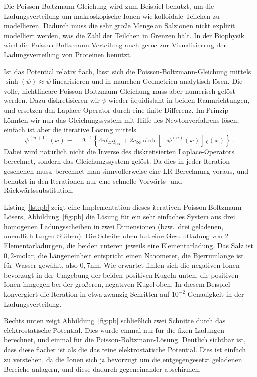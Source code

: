Die Poisson-Boltzmann-Gleichung wird zum Beispiel benutzt, um die
Ladungsverteilung um makroskopische Ionen wie kolloidale Teilchen zu
modellieren. Dadurch muss die sehr große Menge an Salzionen nicht
explizit modelliert werden, was die Zahl der Teilchen in Grenzen
hält. In der Biophysik wird die Poisson-Boltzmann-Verteilung auch
gerne zur Visualisierung der Ladungsverteilung von Proteinen benutzt.

Ist das Potential relativ flach, lässt sich die
Poisson-Boltzmann-Gleichung mittels $\sinh(\psi)\approx \psi$
linearisieren und in manchen Geometrien analytisch lösen. Die volle,
nichtlineare Poisson-Boltzmann-Gleichung muss aber numerisch
gelöst werden. Dazu diskretisieren wir $\psi$ wieder äquidistant in
beiden Raumrichtungen, und ersetzen den Laplace-Operator durch eine
finite Differenz. Im Prinzip könnten wir nun das Gleichungssystem mit
Hilfe des Newtonverfahrens lösen, einfach ist aber die iterative
Lösung mittels
\begin{equation}
  \psi^{(n+1)}(x)  = -\Delta^{-1}\left\{
    4\pi l_Bq_\text{fix} + 2c_\infty\sinh[-\psi^{(n)}(x)]\chi(x)\right\}.
\end{equation}
Dabei wird natürlich nicht die Inverse des diskretisierten
Laplace-Operators berechnet, sondern das Gleichungssystem gelöst. Da
dies in jeder Iteration geschehen muss, berechnet man sinnvollerweise
eine LR-Berechnung voraus, und benutzt in den Iterationen nur eine
schnelle Vorwärts- und Rückwärtssubstitution.

Listing~\ref{lst:pb} zeigt eine Implementation dieses iterativen
Poisson-Boltzmann-Lösers, Abbildung~\ref{fig:pb} die Lösung für ein
sehr einfaches System aus drei homogenen Ladungsscheiben in zwei
Dimensionen (bzw.\ drei geladenen, unendlich langen Stäben). Die
Scheibe oben hat eine Gesamtladung von 2 Elementarladungen, die beiden
unteren jeweils eine Elementarladung. Das Salz ist $0,2$-molar, die
Längeneinheit entspricht einen Nanometer, die Bjerrumlänge ist für
Wasser gewählt, also $0,7$nm. Wie erwartet finden sich die negativen
Ionen bevorzugt in der Umgebung der beiden positiven Kugeln unten, die
positiven Ionen hingegen bei der größeren, negativen Kugel oben. In
diesem Beispiel konvergiert die Iteration in etwa zwanzig Schritten
auf $10^{-2}$ Genauigkeit in der Ladungsverteilung.

Rechts unten zeigt Abbildung~\ref{fig:pb} schließlich zwei Schnitte
durch das elektrostatische Potential. Dies wurde einmal nur für die
fixen Ladungen berechnet, und einmal für die
Poisson-Boltzmann-Lösung. Deutlich sichtbar ist, dass diese flacher
ist als die das reine elektrostatische Potential. Dies ist einfach zu
verstehen, da die Ionen sich ja bevorzugt um die entgegengesetzt
geladenen Bereiche anlagern, und diese dadurch gegeneinander
abschirmen.

